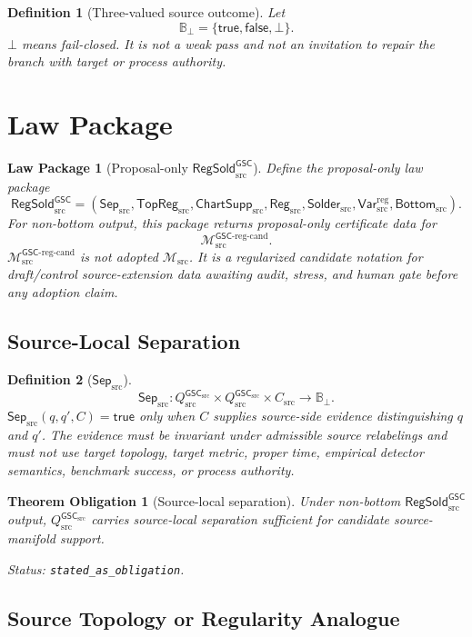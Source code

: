 \documentclass[11pt]{article}
\newcommand{\Msrc}{\mathcal{M}_{\mathrm{src}}}
\newcommand{\Mgscregcand}{\mathcal{M}_{\mathrm{src}}^{\mathsf{GSC}\text{-}\mathrm{reg}\text{-}\mathrm{cand}}}
\newcommand{\GSC}{\mathsf{GSC}_{\mathrm{src}}}
\newcommand{\RegSold}{\mathsf{RegSold}_{\mathrm{src}}^{\mathsf{GSC}}}
\newcommand{\SepSrc}{\mathsf{Sep}_{\mathrm{src}}}
\newcommand{\TopRegSrc}{\mathsf{TopReg}_{\mathrm{src}}}
\newcommand{\ChartSuppSrc}{\mathsf{ChartSupp}_{\mathrm{src}}}
\newcommand{\RegSrc}{\mathsf{Reg}_{\mathrm{src}}}
\newcommand{\SolderSrc}{\mathsf{Solder}_{\mathrm{src}}}
\newcommand{\VarRegSrc}{\mathsf{Var}^{\mathrm{reg}}_{\mathrm{src}}}
\newcommand{\BottomSrc}{\mathsf{Bottom}_{\mathrm{src}}}
\newcommand{\Qsrc}{Q_{\mathrm{src}}^{\GSC}}
\newcommand{\Bot}{\bot}
\newtheorem{definition}{Definition}
\newtheorem{law}{Law Package}
\newtheorem{obligation}{Theorem Obligation}
\begin{document}
\begin{definition}[Three-valued source outcome]
Let
\[
  \mathbb{B}_{\Bot}=\{\mathsf{true},\mathsf{false},\Bot\}.
\]
\(\Bot\) means fail-closed. It is not a weak pass and not an invitation to
repair the branch with target or process authority.
\end{definition}

\section{Law Package}

\begin{law}[Proposal-only \(\RegSold\)]
Define the proposal-only law package
\[
  \RegSold =
  (
    \SepSrc,
    \TopRegSrc,
    \ChartSuppSrc,
    \RegSrc,
    \SolderSrc,
    \VarRegSrc,
    \BottomSrc
  ).
\]
For non-bottom output, this package returns proposal-only certificate data
for
\[
  \Mgscregcand.
\]
\(\Mgscregcand\) is not adopted \(\Msrc\). It is a regularized candidate
notation for draft/control source-extension data awaiting audit, stress, and
human gate before any adoption claim.
\end{law}

\subsection{Source-Local Separation}

\begin{definition}[\(\SepSrc\)]
\[
  \SepSrc : \Qsrc \times \Qsrc \times C_{\mathrm{src}}
  \longrightarrow \mathbb{B}_{\Bot}.
\]
\(\SepSrc(q,q',C)=\mathsf{true}\) only when \(C\) supplies source-side
evidence distinguishing \(q\) and \(q'\). The evidence must be invariant
under admissible source relabelings and must not use target topology,
target metric, proper time, empirical detector semantics, benchmark success,
or process authority.
\end{definition}

\begin{obligation}[Source-local separation]
Under non-bottom \(\RegSold\) output, \(\Qsrc\) carries source-local
separation sufficient for candidate source-manifold support.

Status: \texttt{stated\_as\_obligation}.
\end{obligation}

\subsection{Source Topology or Regularity Analogue}
\end{document}
